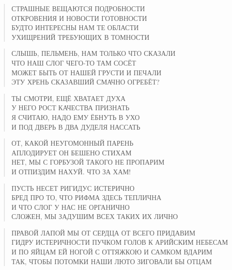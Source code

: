 \poemtitle{***}
\begin{verse}
СТРАШНЫЕ ВЕЩАЮТСЯ ПОДРОБНОСТИ\\
ОТКРОВЕНИЯ И НОВОСТИ ГОТОВНОСТИ\\
БУДТО ИНТЕРЕСНЫ НАМ ТЕ ОБЛАСТИ\\
УХИЩРЕНИЙ ТРЕБУЮЩИХ В ТОМНОСТИ
\end{verse}

\poemtitle{***}
\begin{verse}
СЛЫШЬ, ПЕЛЬМЕНЬ, НАМ ТОЛЬКО ЧТО СКАЗАЛИ\\
ЧТО НАШ СЛОГ ЧЕГО-ТО ТАМ СОСЁТ\\
МОЖЕТ БЫТЬ ОТ НАШЕЙ ГРУСТИ И ПЕЧАЛИ\\
ЭТУ ХРЕНЬ СКАЗАВШИЙ СМАЧНО ОГРЕБЁТ?
\end{verse}

\poemtitle{***}
\begin{verse}
ТЫ СМОТРИ, ЕЩЁ ХВАТАЕТ ДУХА\\
У НЕГО РОСТ КАЧЕСТВА ПРИЗНАТЬ\\
Я СЧИТАЮ, НАДО ЕМУ ЁБНУТЬ В УХО\\
И ПОД ДВЕРЬ В ДВА ДУДЕЛЯ НАССАТЬ
\end{verse}

\poemtitle{***}
\begin{verse}
ОТ, КАКОЙ НЕУГОМОННЫЙ ПАРЕНЬ\\
АПЛОДИРУЕТ ОН БЕШЕНО СТИХАМ\\
НЕТ, МЫ С ГОРБУЗОЙ ТАКОГО НЕ ПРОПАРИМ\\
И ОТПИЗДИМ НАХУЙ. ЧТО ЗА ХАМ!
\end{verse}

\poemtitle{***}
\begin{verse}
ПУСТЬ НЕСЕТ РИГИДУС ИСТЕРИЧНО\\
БРЕД ПРО ТО, ЧТО РИФМА ЗДЕСЬ ТЕПЛИЧНА\\
И ЧТО СЛОГ У НАС НЕ ОРГАНИЧНО\\
СЛОЖЕН, МЫ ЗАДУШИМ ВСЕХ ТАКИХ ИХ ЛИЧНО
\end{verse}

\poemtitle{***}
\begin{verse}
ПРАВОЙ ЛАПОЙ МЫ ОТ СЕРДЦА ОТ ВСЕГО ПРИДАВИМ \\
ГИДРУ ИСТЕРИЧНОСТИ ПУЧКОМ ГОЛОВ К АРИЙСКИМ НЕБЕСАМ\\
И ПО ЯЙЦАМ ЕЙ НОГОЙ С ОТТЯЖКОЮ И САМКОМ ВДАРИМ\\
ТАК, ЧТОБЫ ПОТОМКИ НАШИ ЛЮТО ЗИГОВАЛИ БЫ ОТЦАМ
\end{verse}

